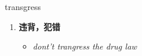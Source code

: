 
\begin{frame}
{\huge transgress}
\begin{center}
\begin{enumerate}\Large
  \item \textbf{违背，犯错}
  \begin{itemize}
    \item \em{\Large{dont't trangress the drug law}}
  \end{itemize}
\end{enumerate}
\end{center}
\end{frame}
